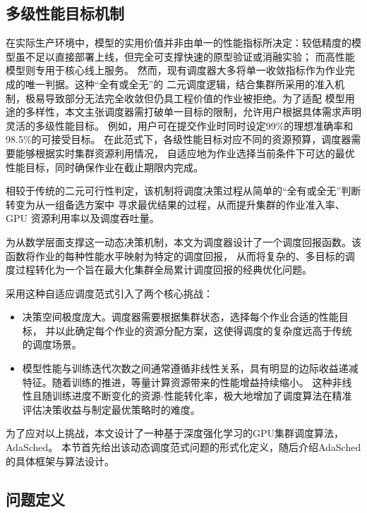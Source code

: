 \subsection{多级性能目标机制}\label{subsec:multi-level}

在实际生产环境中，模型的实用价值并非由单一的性能指标所决定：较低精度的模型虽不足以直接部署上线，但完全可支撑快速的原型验证或消融实验；
而高性能模型则专用于核心线上服务。
然而，现有调度器大多将单一收敛指标作为作业完成的唯一判据。这种“全有或全无”的
二元调度逻辑，结合集群所采用的准入机制，极易导致部分无法完全收敛但仍具工程价值的作业被拒绝。为了适配
模型用途的多样性，本文主张调度器需打破单一目标的限制，允许用户根据具体需求声明灵活的多级性能目标。
例如，用户可在提交作业时同时设定99\%的理想准确率和98.5\%的可接受目标。
在此范式下，各级性能目标对应不同的资源预算，调度器需要能够根据实时集群资源利用情况，
自适应地为作业选择当前条件下可达的最优性能目标，同时确保作业在截止期限内完成。

相较于传统的二元可行性判定，该机制将调度决策过程从简单的“全有或全无”判断转变为从一组备选方案中
寻求最优结果的过程，从而提升集群的作业准入率、GPU 资源利用率以及调度吞吐量。

为从数学层面支撑这一动态决策机制，本文为调度器设计了一个调度回报函数。该函数将作业的每种性能水平映射为特定的调度回报，
从而将复杂的、多目标的调度过程转化为一个旨在最大化集群全局累计调度回报的经典优化问题。

采用这种自适应调度范式引入了两个核心挑战：
\begin{itemize}
  \item 决策空间极度庞大。调度器需要根据集群状态，选择每个作业合适的性能目标，
        并以此确定每个作业的资源分配方案，这使得调度的复杂度远高于传统的调度场景。
  \item 模型性能与训练迭代次数之间通常遵循非线性关系，具有明显的边际收益递减特征。随着训练的推进，等量计算资源带来的性能增益持续缩小。
        这种非线性且随训练进度不断变化的资源-性能转化率，极大地增加了调度算法在精准评估决策收益与制定最优策略时的难度。
\end{itemize}

为了应对以上挑战，本文设计了一种基于深度强化学习的GPU集群调度算法，AdaSched。
本节首先给出该动态调度范式问题的形式化定义，随后介绍AdaSched的具体框架与算法设计。

\subsection{问题定义}\label{subsec:formulation}

